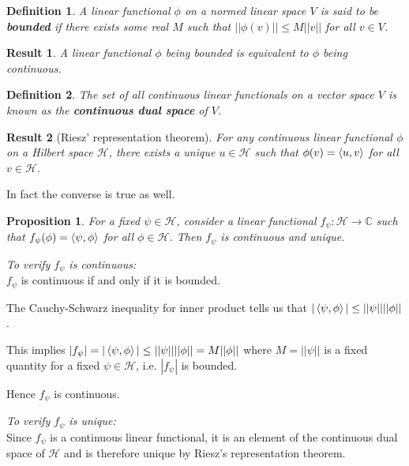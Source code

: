 \documentclass[12pt,twoside,fleqn]{report}
\makeatletter
\theoremstyle{thmstyle}
\renewenvironment{proof}[1][\proofname]{\par
\pushQED{\qed}%
\normalfont \topsep6\p@\@plus6\p@\relax
\trivlist
\item[\hskip\labelsep\itshape#1\@addpunct{.}]\mbox{}\par\nobreak\ignorespaces
}{%
    \popQED\endtrivlist\@endpefalse
    }
\newtheorem{defn}{Definition}[chapter]
\newtheorem{result}{Result}[chapter]
\newtheorem{prop}{Proposition}[chapter]
\makeatother
\begin{document}
\begin{defn}
A linear functional $\phi$ on a normed linear space $V$ is said to be \textbf{bounded} if there exists some real $M$ such that $|| \phi(v)|| \leq M ||v||$ for all $v \in V$. 
\end{defn}

\begin{result}
A linear functional $\phi$ being bounded is equivalent to $\phi$ being continuous.
\end{result}

\begin{defn}
    The set of all continuous linear functionals on a vector space $V$ is known as the \textbf{continuous dual space} of $V$.
\end{defn}

\begin{result}[Riesz' representation theorem]
    For any continuous linear functional $\phi$ on a Hilbert space $\mathcal{H}$, there exists a unique $u \in \mathcal{H}$ such that $\phi(v) = \braket{u,v}$ for all $v \in \mathcal{H}$. 
\end{result}

In fact the converse is true as well.

\begin{prop}
\label{innerproduct:continuous}
For a fixed $\psi \in \mathcal{H}$, consider a linear functional $f_\psi : \mathcal{H} \to \mathbb{C}$ such that $f_\psi(\phi) = \braket{\psi,\phi}$ for all $\phi \in \mathcal{H}$. Then $f_\psi$ is continuous and unique. 
\end{prop}
\begin{proof}
    \textit{To verify $f_\psi$ is continuous:} \\
    $f_\psi$ is continuous if and only if it is bounded. 

    The Cauchy-Schwarz inequality for inner product tells us that $|\braket{\psi,\phi}| \leq ||\psi||||\phi||$.

    This implies $|f_\psi| = |\braket{\psi,\phi}| \leq ||\psi|| ||\phi|| = M ||\phi||$ where $M = ||\psi||$ is a fixed quantity for a fixed $\psi \in \mathcal{H}$, i.e. $|f_\psi|$ is bounded.

    Hence $f_\psi$ is continuous. 

    \textit{To verify $f_\psi$ is unique:} \\
    
    Since $f_\psi$ is a continuous linear functional, it is an element of the continuous dual space of $\mathcal{H}$ and is therefore unique by Riesz's representation theorem.
\end{proof}
\end{document}

